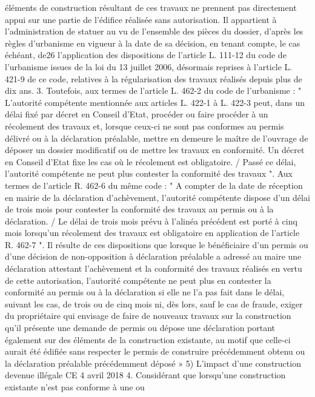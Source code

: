 \documentclass[11pt,a4paper]{report}
\begin{document}
	éléments de construction résultant de ces travaux ne prennent pas directement appui sur une partie de l'édifice
	réalisée sans autorisation. Il appartient à l'administration de statuer au vu de l'ensemble des pièces du dossier,
	d'après les règles d'urbanisme en vigueur à la date de sa décision, en tenant compte, le cas échéant, de26
	l'application des dispositions de l'article L. 111-12 du code de l'urbanisme issues de la loi du 13 juillet 2006,
	désormais reprises à l'article L. 421-9 de ce code, relatives à la régularisation des travaux réalisés depuis plus
	de dix ans.
	3. Toutefois, aux termes de l'article L. 462-2 du code de l'urbanisme : " L'autorité compétente mentionnée aux
	articles L. 422-1 à L. 422-3 peut, dans un délai fixé par décret en Conseil d'Etat, procéder ou faire procéder à
	un récolement des travaux et, lorsque ceux-ci ne sont pas conformes au permis délivré ou à la déclaration
	préalable, mettre en demeure le maître de l'ouvrage de déposer un dossier modificatif ou de mettre les travaux
	en conformité. Un décret en Conseil d'Etat fixe les cas où le récolement est obligatoire. / Passé ce délai,
	l'autorité compétente ne peut plus contester la conformité des travaux ". Aux termes de l'article R. 462-6 du
	même code : " A compter de la date de réception en mairie de la déclaration d'achèvement, l'autorité compétente
	dispose d'un délai de trois mois pour contester la conformité des travaux au permis ou à la déclaration. / Le
	délai de trois mois prévu à l'alinéa précédent est porté à cinq mois lorsqu'un récolement des travaux est
	obligatoire en application de l'article R. 462-7 ". Il résulte de ces dispositions que lorsque le bénéficiaire d'un
	permis ou d'une décision de non-opposition à déclaration préalable a adressé au maire une déclaration attestant
	l'achèvement et la conformité des travaux réalisés en vertu de cette autorisation, l'autorité compétente ne peut
	plus en contester la conformité au permis ou à la déclaration si elle ne l'a pas fait dans le délai, suivant les cas,
	de trois ou de cinq mois ni, dès lors, sauf le cas de fraude, exiger du propriétaire qui envisage de faire de
	nouveaux travaux sur la construction qu'il présente une demande de permis ou dépose une déclaration portant
	également sur des éléments de la construction existante, au motif que celle-ci aurait été édifiée sans respecter le
	permis de construire précédemment obtenu ou la déclaration préalable précédemment déposé »
	5) L’impact d’une construction devenue illégale
	CE 4 avril 2018  4. Considérant que lorsqu'une construction existante n'est pas conforme à une ou
\end{document}
